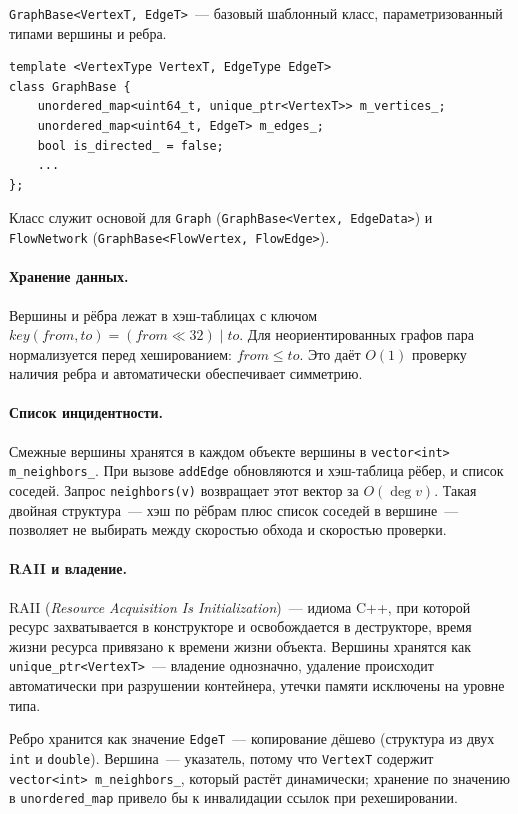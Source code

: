 \texttt{GraphBase<VertexT, EdgeT>}~--- базовый шаблонный класс, параметризованный
типами вершины и ребра.

\begin{lstlisting}[style=cppstyle, caption={Объявление GraphBase (GraphBase.h)}]
template <VertexType VertexT, EdgeType EdgeT>
class GraphBase {
    unordered_map<uint64_t, unique_ptr<VertexT>> m_vertices_;
    unordered_map<uint64_t, EdgeT> m_edges_;
    bool is_directed_ = false;
    ...
};
\end{lstlisting}

Класс служит основой для \texttt{Graph} (\texttt{GraphBase<Vertex, EdgeData>})
и \\ \texttt{FlowNetwork} (\texttt{GraphBase<FlowVertex, FlowEdge>}).

\paragraph{Хранение данных.} Вершины и рёбра лежат в хэш-таблицах с ключом
$\mathit{key}(from, to) = (from \ll 32)\;|\;to$. Для неориентированных
графов пара нормализуется перед хешированием: $from \leq to$. Это даёт
$O(1)$ проверку наличия ребра и автоматически обеспечивает симметрию.

\paragraph{Список инцидентности.} Смежные вершины хранятся в каждом объекте
вершины в \texttt{vector<int> m\_neighbors\_}. При вызове \texttt{addEdge}
обновляются и хэш-таблица рёбер, и список соседей. Запрос
\texttt{neighbors(v)} возвращает этот вектор за $O(\deg v)$. Такая
двойная структура~--- хэш по рёбрам плюс список соседей в вершине~---
позволяет не выбирать между скоростью обхода и скоростью проверки.

\paragraph{RAII и владение.} RAII (\textit{Resource Acquisition Is Initialization})~---
идиома C++, при которой ресурс захватывается в конструкторе и освобождается
в деструкторе, время жизни ресурса привязано к времени жизни объекта.
Вершины хранятся как \texttt{unique\_ptr<VertexT>}~---
владение однозначно, удаление происходит автоматически при разрушении
контейнера, утечки памяти исключены на уровне типа.

Ребро хранится как значение \texttt{EdgeT}~--- копирование дёшево
(структура из двух \texttt{int} и \texttt{double}). Вершина~--- указатель, потому что
\texttt{VertexT} содержит \texttt{vector<int> m\_neighbors\_},
который растёт динамически; хранение по значению в \texttt{unordered\_map}
привело бы к инвалидации ссылок при рехешировании.

